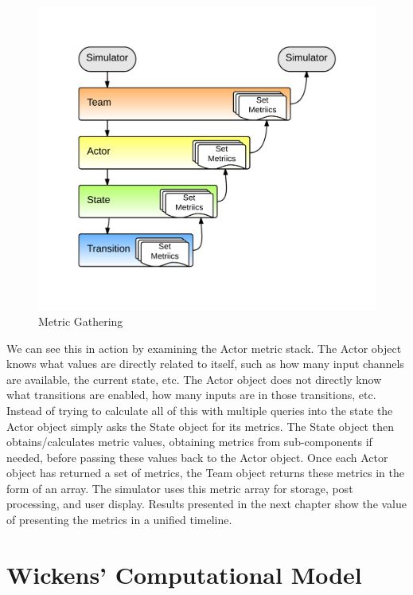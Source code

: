 \begin{figure}[h]
\begin{center}
\includegraphics[width=6in]{metric_gathering.png}
\caption{Metric Gathering}
\label{fig:metric_gathering}
\end{center}
\end{figure}


We can see this in action by examining the Actor metric stack.  The Actor object knows what values are directly related to itself, such as how many input channels are available, the current state, etc.  The Actor object does not directly know what transitions are enabled, how many inputs are in those transitions, etc.  Instead of trying to calculate all of this with multiple queries into the state the Actor object simply asks the State object for its metrics.  The State object then obtains/calculates metric values, obtaining metrics from sub-components if needed, before passing these values back to the Actor object.  Once each Actor object has returned a set of metrics, the Team object returns these metrics in the form of an array.  The simulator uses this metric array for storage, post processing, and user display.  Results presented in the next chapter show the value of presenting the metrics in a unified timeline.



\section{Wickens' Computational Model}

